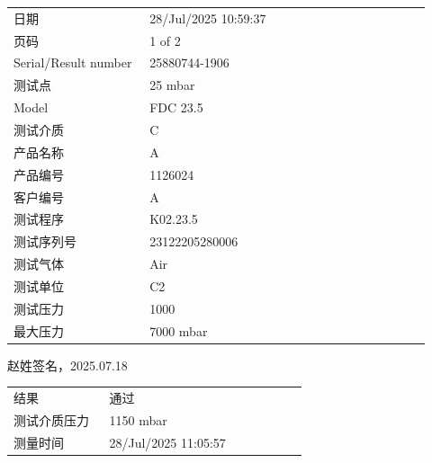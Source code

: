 \documentclass[UTF8,10pt,a4paper,fontset=fandol]{ctexart}
\newcommand{\fieldvalue}[1]{#1}
\newcommand{\handwritten}[1]{#1}
\begin{document}
\begin{tabular}{@{}p{0.30\linewidth}p{0.62\linewidth}@{}}
日期 &
\fieldvalue{28/Jul/2025 10:59:37}
\\
页码 &
\fieldvalue{1 of 2}
\\
Serial/Result number &
\fieldvalue{25880744-1906}
\\
测试点 &
\fieldvalue{25 mbar}
\\
Model &
\fieldvalue{FDC 23.5}
\\
测试介质 &
\fieldvalue{C}
\\
产品名称 &
\fieldvalue{A}
\\
产品编号 &
\fieldvalue{1126024}
\\
客户编号 &
\fieldvalue{A}
\\
测试程序 &
\fieldvalue{K02.23.5}
\\
测试序列号 &
\fieldvalue{23122205280006}
\\
测试气体 &
\fieldvalue{Air}
\\
测试单位 &
\fieldvalue{C2}
\\
测试压力 &
\fieldvalue{1000}
\\
最大压力 &
\fieldvalue{7000 mbar}
\\
\end{tabular}

\handwritten{赵姓签名，2025.07.18}

\begin{tabular}{@{}p{0.30\linewidth}p{0.62\linewidth}@{}}
结果 &
\fieldvalue{通过}
\\
测试介质压力 &
\fieldvalue{1150 mbar}
\\
测量时间 &
\fieldvalue{28/Jul/2025 11:05:57}
\\
\end{tabular}
\end{document}
